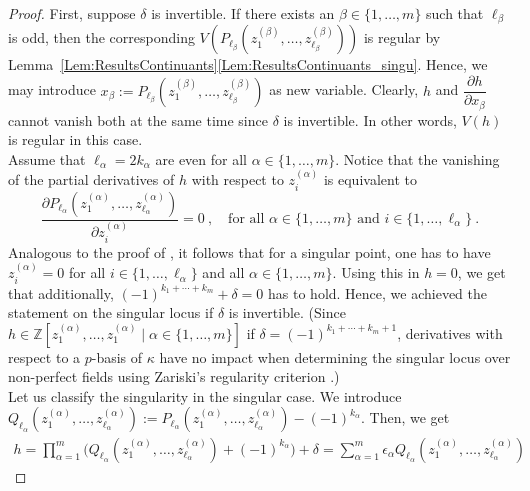 \documentclass[letter,11pt]{amsart}
\newcommand{\ZZ}{\ensuremath{\mathbb{Z}}}
\theoremstyle{theorem}
\theoremstyle{definition}
\newcommand{\len}{\ell}
\newcommand{\halflen}{k}
\numberwithin{equation}{section}
\begin{document}
\begin{proof}
	First, suppose $ \delta $ is invertible. 
	If there exists an $ \beta \in \{ 1, \ldots, m \} $ such that $ \len_\beta $ is odd, 
	then the corresponding $ V ( P_{\len_\beta} (z_1^{(\beta)}, \ldots, z_{\len_\beta}^{(\beta)}) ) $ is regular by Lemma~\ref{Lem:ResultsContinuants}\eqref{Lem:ResultsContinuants_singu}.  
	Hence, we may introduce $ x_\beta :=  P_{\len_\beta} (z_1^{(\beta)}, \ldots, z_{\len_\beta}^{(\beta)}) $ as new variable.
	Clearly, $ h $ and $ \dfrac{\partial h}{\partial x_\beta} $ cannot vanish both at the same time since $ \delta $ is invertible. 
	In other words, $ V (h) $ is regular in this case. 
	\\
	Assume that $ \len_\alpha = 2 \halflen_\alpha $ are even for all $ \alpha \in \{ 1, \ldots, m \} $. 
	Notice that the vanishing of the partial derivatives of $ h $
	with respect to $ z_i^{(\alpha)} $ is equivalent to 
	\[
	\frac{\partial P_{\len_\alpha} (z_1^{(\alpha)}, \ldots, z_{\len_\alpha}^{(\alpha)})}{\partial z_i^{(\alpha)}} = 0
	\ , 
	\ \ \
	\mbox{ for all }
	\alpha \in \{1, \ldots, m \}
	\mbox{ and } i \in \{ 1 , \ldots, \len_\alpha \}
	\ . 
	\] 
	Analogous to the proof of \cite[Lemma~3.7]{BFMS23}, it follows that for a singular point, one has to have 
	$ z_i^{(\alpha)} = 0 $ for all $ i \in \{ 1, \ldots, \len_\alpha \} $ and all $ \alpha \in \{ 1, \ldots, m \} $.  
	Using this in $ h = 0 $, we get that additionally, $ (-1)^{\halflen_1 + \cdots + \halflen_m} + \delta  = 0 $ has to hold. 
	Hence, we achieved the statement on the singular locus if $ \delta $ is invertible. 
	(Since $ h \in \ZZ[z_1^{(\alpha)}, \ldots, z_1^{(\alpha)} \mid \alpha \in \{1, \ldots, m \}] $
	if $ \delta = (-1)^{\halflen_1 + \cdots + \halflen_m+1} $,
	derivatives with respect to a $ p $-basis of $ \kappa $ have no impact when determining the singular locus over non-perfect fields using Zariski's regularity criterion \cite[Theorem~11, p.~39]{Zar47}.)
	\\
	Let us classify the singularity in the singular case. 
	We introduce $ Q_{\len_\alpha} (z_1^{(\alpha)}, \ldots, z_{\len_\alpha}^{(\alpha)}) := P_{\len_\alpha} ( z_1^{(\alpha)}, \ldots, z_{\len_\alpha}^{(\alpha)} )  - (-1)^{\halflen_\alpha} $.
	Then, we get
	\[
	\begin{array}{c} 
		\displaystyle 
		h = 
		\prod_{\alpha=1}^m \Big( Q_{\len_\alpha} (z_1^{(\alpha)}, \ldots, z_{\len_\alpha}^{(\alpha)}) + (-1)^{\halflen_\alpha} \Big) + \delta
		=
		\sum_{\alpha=1}^m \epsilon_\alpha  Q_{\len_\alpha} (z_1^{(\alpha)}, \ldots, z_{\len_\alpha}^{(\alpha)})

\end{array}\]
\end{proof}
\end{document}
